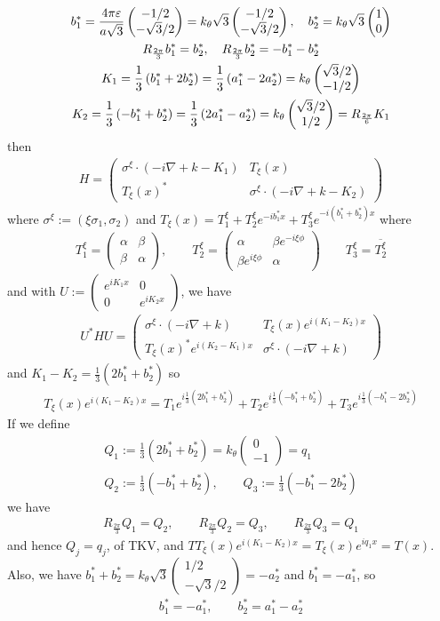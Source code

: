 \documentclass[11pt,a4paper,reqno,french,tikz]{amsart}
\newcommand{\pa}[1]{\left( #1 \right)} %
\newcommand{\na}{\nabla} %
\newcommand{\f}[2]{\frac{#1}{#2}} %
\newcommand{\mat}[1]{\begin{pmatrix} #1 \end{pmatrix}} %
\begin{document}
\begin{multline*}
b_1^* = \f{4\pi \ep}{a\sqrt{3}} \mat{-1/2 \\ -\sqrt{3}/2} = k_\theta \sqrt{3} \mat{-1/2 \\ -\sqrt{3}/2},\quad b_2^* = k_\theta \sqrt{3} \mat{1 \\ 0} \\
R_{\f{2\pi}{3}} b_1^*= b_2^*,\quad R_{\f{2\pi}{3}} b_2^* = -b_1^* - b_2^* \\
K_1 = \f 13 \pa{b_1^* + 2 b_2^*} = \f 13 \pa{a_1^* -2a_2^*} = k_\theta \mat{\sqrt{3}/2 \\ -1/2} \\
K_2 = \f 13 \pa{-b_1^* +  b_2^*}= \f 13 \pa{2a_1^*  -a_2^*} = k_\theta \mat{\sqrt{3}/2 \\ 1/2} = R_{\f{2\pi}{6}} K_1
\end{multline*}
then
\begin{align*}
	H = \mat{\sigma^\xi \cdot \pa{-i\na + k - K_1} & T_\xi(x) \\ T_\xi(x)^* & \sigma^\xi \cdot \pa{-i\na + k - K_2}}
\end{align*}
where $\sigma^\xi := \pa{\xi \sigma_1,\sigma_2}$ and $T_\xi(x) = T^\xi_1  + T^\xi_2 e^{-i b_1^* x} + T^\xi_3 e^{-i(b_1^* + b_2^*) x}$ where
\begin{align*}
	T_1^\xi = \mat{\alpha & \beta \\ \beta & \alpha},\qquad T_2^\xi = \mat{\alpha & \beta e^{-i\xi\phi} \\ \beta e^{i\xi \phi} & \alpha}\qquad T^\xi_3 = \overline{T_2^\xi}
\end{align*}
and with $U := \mat{e^{iK_1 x} & 0 \\ 0 & e^{iK_2 x}}$, we have
\begin{align*}
U^* H U = \mat{\sigma^\xi \cdot \pa{-i\na + k} & T_\xi(x) e^{i\pa{K_1 - K_2}x} \\ T_\xi(x)^*e^{i\pa{K_2 - K_1}x} & \sigma^\xi \cdot \pa{-i\na + k}}
\end{align*}
and $K_1 - K_2 = \f 13 \pa{2b_1^* + b_2^*}$ so
\begin{align*}
T_\xi(x) e^{i\pa{K_1 - K_2}x} = T_1 e^{i \f 13 \pa{2b_1^* + b_2^*}} + T_2 e^{i \f 13 \pa{-b_1^* + b_2^*}}+ T_3 e^{i \f 13 \pa{-b_1^*-2 b_2^*} }
\end{align*}
If we define
\begin{multline*}
Q_1 := \f 13 \pa{2b_1^* + b_2^*} = k_\theta \mat{0 \\ -1} = q_1 \\
Q_2 := \f 13\pa{-b_1^* + b_2^*},\qquad Q_3 :=  \f 13 \pa{-b_1^* - 2b_2^*}
\end{multline*}
we have
\begin{align*}
R_{\f{2\pi}{3}} Q_1 = Q_2,\qquad R_{\f{2\pi}{3}} Q_2 = Q_3,\qquad R_{\f{2\pi}{3}} Q_3 = Q_1
\end{align*}
and hence $Q_j = q_j$, of TKV, and $TT_\xi(x) e^{i\pa{K_1 -K_2}x} = T_\xi(x) e^{iq_1 x} = T(x)$. Also, we have $b_1^* + b_2^* = k_\theta \sqrt{3} \mat{1/2 \\ -\sqrt{3}/2} = -a_2^*$ and $b_1^* = - a_1^*$, so
\begin{align*}
b_1^* = -a_1^*,\qquad b_2^* = a_1^* - a_2^*
\end{align*}
\end{document}
